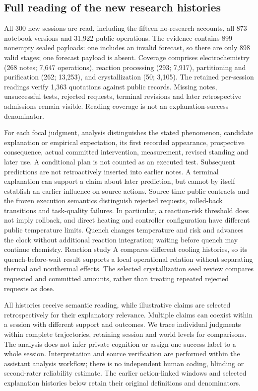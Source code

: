 \documentclass[10pt,a4paper]{article}
\begin{document}
\subsection{Full reading of the new research histories}\label{full-reading-of-the-new-research-histories}

All 300 new sessions are read, including the fifteen no-research accounts, all 873 notebook versions and 31,922 public operations. The evidence contains 899 nonempty sealed payloads: one includes an invalid forecast, so there are only 898 valid stages; one forecast payload is absent. Coverage comprises electrochemistry (268 notes; 7,647 operations), reaction processing (293; 7,917), partitioning and purification (262; 13,253), and crystallization (50; 3,105). The retained per-session readings verify 1,363 quotations against public records. Missing notes, unsuccessful tests, rejected requests, terminal revisions and later retrospective admissions remain visible. Reading coverage is not an explanation-success denominator.

For each focal judgment, analysis distinguishes the stated phenomenon, candidate explanation or empirical expectation, its first recorded appearance, prospective consequence, actual committed intervention, measurement, revised standing and later use. A conditional plan is not counted as an executed test. Subsequent predictions are not retroactively inserted into earlier notes. A terminal explanation can support a claim about later prediction, but cannot by itself establish an earlier influence on source actions. Source-time public contracts and the frozen execution semantics distinguish rejected requests, rolled-back transitions and task-quality failures. In particular, a reaction-risk threshold does not imply rollback, and direct heating and controller configuration have different public temperature limits. Quench changes temperature and risk and advances the clock without additional reaction integration; waiting before quench may continue chemistry. Reaction study A compares different cooling histories, so its quench-before-wait result supports a local operational relation without separating thermal and nonthermal effects. The selected crystallization seed review compares requested and committed amounts, rather than treating repeated rejected requests as dose.

All histories receive semantic reading, while illustrative claims are selected retrospectively for their explanatory relevance. Multiple claims can coexist within a session with different support and outcomes. We trace individual judgments within complete trajectories, retaining session and world levels for comparisons. The analysis does not infer private cognition or assign one success label to a whole session. Interpretation and source verification are performed within the assistant analysis workflow; there is no independent human coding, blinding or second-rater reliability estimate. The earlier action-linked windows and selected explanation histories below retain their original definitions and denominators.
\end{document}
